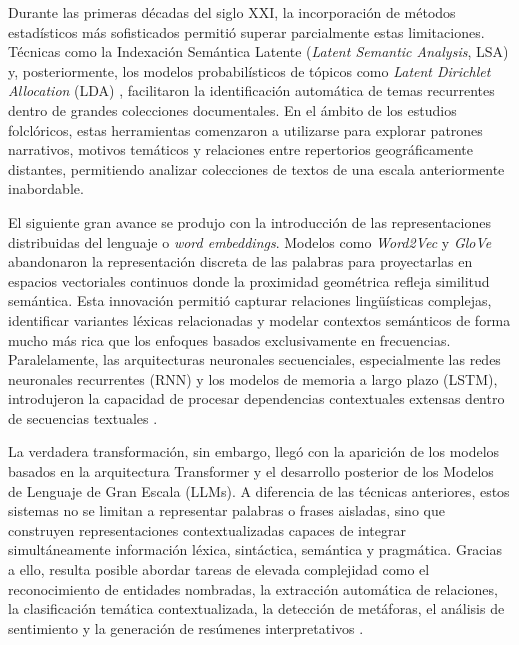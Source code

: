 Durante las primeras décadas del siglo XXI, la incorporación de métodos estadísticos más sofisticados permitió superar parcialmente estas limitaciones. Técnicas como la Indexación Semántica Latente (\textit{Latent Semantic Analysis}, LSA) \citep{deerwester1990indexing} y, posteriormente, los modelos probabilísticos de tópicos como \textit{Latent Dirichlet Allocation} (LDA) \citep{blei2003latent}, facilitaron la identificación automática de temas recurrentes dentro de grandes colecciones documentales. En el ámbito de los estudios folclóricos, estas herramientas comenzaron a utilizarse para explorar patrones narrativos, motivos temáticos y relaciones entre repertorios geográficamente distantes, permitiendo analizar colecciones de textos de una escala anteriormente inabordable.

El siguiente gran avance se produjo con la introducción de las representaciones distribuidas del lenguaje o \textit{word embeddings}. Modelos como \textit{Word2Vec} \citep{mikolov2013efficient} y \textit{GloVe} \citep{pennington2014glove} abandonaron la representación discreta de las palabras para proyectarlas en espacios vectoriales continuos donde la proximidad geométrica refleja similitud semántica. Esta innovación permitió capturar relaciones lingüísticas complejas, identificar variantes léxicas relacionadas y modelar contextos semánticos de forma mucho más rica que los enfoques basados exclusivamente en frecuencias. Paralelamente, las arquitecturas neuronales secuenciales, especialmente las redes neuronales recurrentes (RNN) y los modelos de memoria a largo plazo (LSTM), introdujeron la capacidad de procesar dependencias contextuales extensas dentro de secuencias textuales \citep{hochreiter1997long}.

La verdadera transformación, sin embargo, llegó con la aparición de los modelos basados en la arquitectura Transformer \citep{vaswani2017attention} y el desarrollo posterior de los Modelos de Lenguaje de Gran Escala (LLMs). A diferencia de las técnicas anteriores, estos sistemas no se limitan a representar palabras o frases aisladas, sino que construyen representaciones contextualizadas capaces de integrar simultáneamente información léxica, sintáctica, semántica y pragmática. Gracias a ello, resulta posible abordar tareas de elevada complejidad como el reconocimiento de entidades nombradas, la extracción automática de relaciones, la clasificación temática contextualizada, la detección de metáforas, el análisis de sentimiento y la generación de resúmenes interpretativos \citep{devlin2019bert}.

